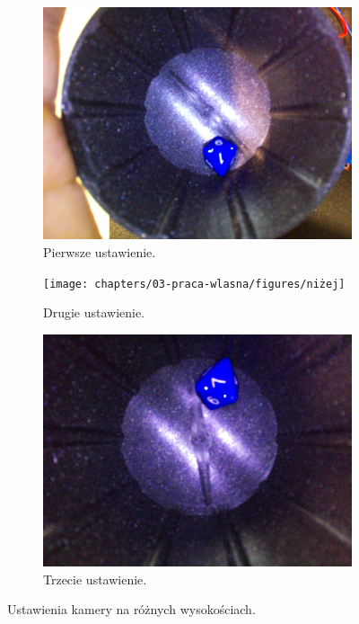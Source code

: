 \begin{figure}[h]
    \centering
    \begin{subfigure}{0.32\textwidth}
        \centering
        \includegraphics[width=\linewidth]{chapters/03-praca-wlasna/figures/wysoko}
        \caption{\label{fig:wysoko}Pierwsze ustawienie.}
    \end{subfigure}
    \hfill
    \begin{subfigure}{0.32\textwidth}
        \centering
        \texttt{[image: chapters/03-praca-wlasna/figures/niżej]}
        \caption{\label{fig:nizej}Drugie ustawienie.}
    \end{subfigure}
    \hfill
    \begin{subfigure}{0.32\textwidth}
        \centering
        \includegraphics[width=\linewidth]{chapters/03-praca-wlasna/figures/ideolo}
        \caption{\label{fig:ideolo}Trzecie ustawienie.}
    \end{subfigure}
    \caption{\label{fig:wysokosci}Ustawienia kamery na różnych wysokościach.}
\end{figure}

